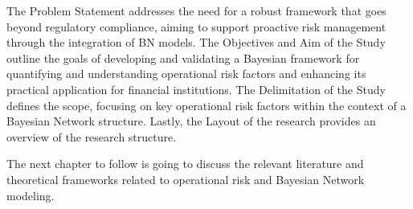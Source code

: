 The Problem Statement addresses the need for a robust framework that goes beyond regulatory compliance, aiming to support proactive risk management through the integration of BN models. The Objectives and Aim of the Study outline the goals of developing and validating a Bayesian framework for quantifying and understanding operational risk factors and enhancing its practical application for financial institutions. The Delimitation of the Study defines the scope, focusing on key operational risk factors within the context of a Bayesian Network structure. Lastly, the Layout of the research provides an overview of the research structure.

The next chapter to follow is going to discuss the relevant literature and theoretical frameworks related to operational risk and Bayesian Network modeling.

